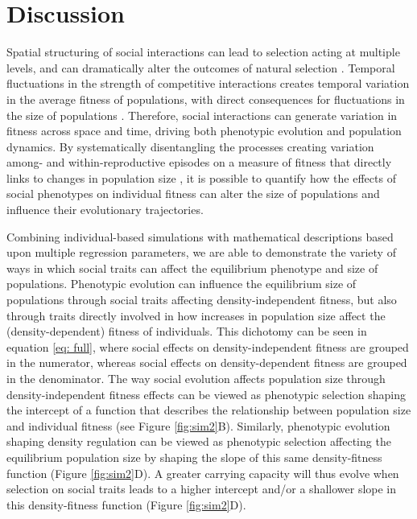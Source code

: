 \documentclass{article}
\begin{document}
\section{Discussion}
Spatial structuring of social interactions can lead to selection acting at multiple levels, and can dramatically alter the outcomes of natural selection \citep{Okasha2004, frank1998foundations, Wolf1999SocialSelection}. Temporal fluctuations in the strength of competitive interactions creates temporal variation in the average fitness of populations, with direct consequences for fluctuations in the size of populations \citep{Gilpin1973a}. Therefore, social interactions can generate variation in fitness across space and time, driving both phenotypic evolution and population dynamics. By systematically disentangling the processes creating variation among- and within-reproductive episodes on a measure of fitness that directly links to changes in population size \citep{Saether2015}, it is possible to quantify how the effects of social phenotypes on individual fitness can alter the size of populations and influence their evolutionary trajectories. 

Combining individual-based simulations with mathematical descriptions based upon multiple regression parameters, we are able to demonstrate the variety of ways in which social traits can affect the equilibrium phenotype and size of populations. Phenotypic evolution can influence the equilibrium size of populations through social traits affecting density-independent fitness, but also through traits directly involved in how increases in population size affect the (density-dependent) fitness of individuals. This dichotomy can be seen in equation \ref{eq: full}, where social effects on density-independent fitness are grouped in the numerator, whereas social effects on density-dependent fitness are grouped in the denominator. The way social evolution affects population size through density-independent fitness effects can be viewed as phenotypic selection shaping the intercept of a function that describes the relationship between population size and individual fitness (see Figure \ref{fig:sim2}B). Similarly, phenotypic evolution shaping density regulation can be viewed as phenotypic selection affecting the equilibrium population size by shaping the slope of this same density-fitness function (Figure \ref{fig:sim2}D). A greater carrying capacity will thus evolve when selection on social traits leads to a higher intercept and/or a shallower slope in this density-fitness function (Figure \ref{fig:sim2}D). 
\end{document}
